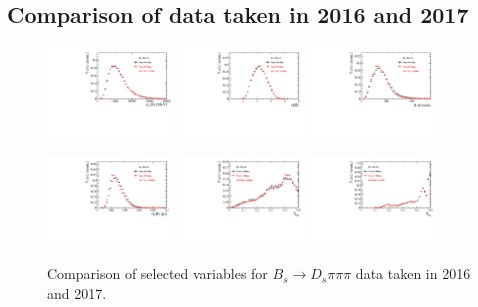 \clearpage
\subsection{Comparison of data taken in 2016 and 2017}
\label{ssec:16vs17}

\begin{figure}[h]
\centering
\includegraphics[height=!,width=0.3\textwidth]{figs/dataVsMC/year16vs17_norm/Ds2all_Bs_PT.pdf}
\includegraphics[height=!,width=0.3\textwidth]{figs/dataVsMC/year16vs17_norm/Ds2all_Bs_ETA.pdf}
\includegraphics[height=!,width=0.3\textwidth]{figs/dataVsMC/year16vs17_norm/Ds2all_NTracks.pdf}


\includegraphics[height=!,width=0.3\textwidth]{figs/dataVsMC/year16vs17_norm/Ds2all_Bs_BsDTF_TAUERR.pdf}
\includegraphics[height=!,width=0.3\textwidth]{figs/dataVsMC/year16vs17_norm/Ds2all_OS_Combination_PROB.pdf}
\includegraphics[height=!,width=0.3\textwidth]{figs/dataVsMC/year16vs17_norm/Ds2all_SS_Kaon_PROB.pdf}

\caption{Comparison of selected variables for $B_s \to D_s \pi \pi \pi$ data taken in 2016 and 2017.}
\label{fig:Norm_16v17}
\end{figure}

